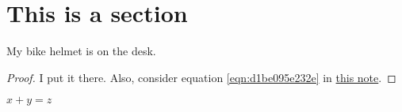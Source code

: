 \documentclass[reqno]{amsart} 
\begin{document}
\section{This is a section}
\begin{theorem}
My bike helmet is on the desk.
\end{theorem}
\begin{proof}
I put it there.  Also, consider equation \eqref{eqn:d1be095e232e} in \href{20230614T131127__rings-of-differential-operators-blue-book-on-the-desk.pdf}{this note}.
\end{proof}

$x + y = z$


{} 
\end{document}

